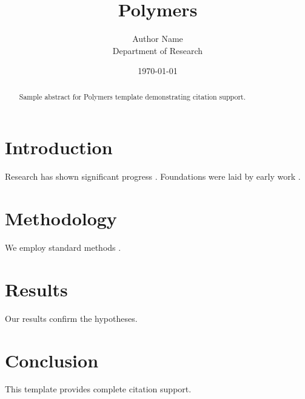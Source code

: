 \documentclass{mdpi}
\title{Polymers}
\author{Author Name \\ \small Department of Research}
\date{\today}
\begin{document}
\maketitle

\begin{abstract}
Sample abstract for Polymers template demonstrating citation support.
\end{abstract}

\section{Introduction}
Research has shown significant progress \citep{einstein1905}. Foundations were laid by early work \citep{turing1950}.

\section{Methodology}
We employ standard methods \citep{knuth1984}.

\section{Results}
Our results confirm the hypotheses.

\section{Conclusion}
This template provides complete citation support.



\end{document}
